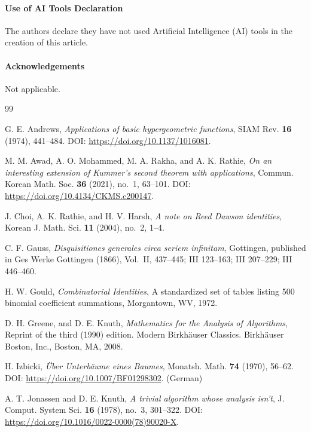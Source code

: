 \documentclass[reqno]{amsart}
\numberwithin{equation}{section}
\theoremstyle{plain}
\theoremstyle{remark}
\begin{document}
\paragraph{\bf Use of AI Tools Declaration}
The authors declare they have not used Artificial Intelligence (AI) tools in the creation of this article.

\paragraph{\bf Acknowledgements}
Not applicable.

\begin{thebibliography}{99}

G. E. Andrews, \textit{Applications of basic hypergeometric functions}, SIAM Rev. \textbf{16} (1974), 441\nobreakdash--484. DOI: \url{https://doi.org/10.1137/1016081}.

M. M. Awad, A. O. Mohammed, M. A. Rakha, and A. K. Rathie, \textit{On an interesting extension of Kummer's second theorem with applications}, Commun. Korean Math. Soc. \textbf{36} (2021), no.~1, 63\nobreakdash--101. DOI: \url{https://doi.org/10.4134/CKMS.c200147}.

J. Choi, A. K. Rathie, and H. V. Harsh, \textit{A note on Reed Dawson identities}, Korean J. Math. Sci. \textbf{11} (2004), no.~2, 1\nobreakdash--4.

C. F. Gauss, \textit{Disquisitiones generales circa seriem infinitam}, Gottingen, published in Ges Werke Gottingen (1866), Vol.~II, 437\nobreakdash--445; III 123\nobreakdash--163; III 207\nobreakdash--229; III 446\nobreakdash--460.

H. W. Gould, \emph{Combinatorial Identities}, A standardized set of tables listing 500 binomial coefficient summations, Morgantown, WV, 1972.

D. H. Greene, and D. E. Knuth, \textit{Mathematics for the Analysis of Algorithms}, Reprint of the third (1990) edition. Modern Birkh\"auser Classics. Birkh\"auser Boston, Inc., Boston, MA, 2008.

H. Izbicki, \textit{\"Uber Unterb\"aume eines Baumes}, Monatsh. Math. \textbf{74} (1970), 56\nobreakdash--62. DOI: \url{https://doi.org/10.1007/BF01298302}. (German)

A. T. Jonassen and D. E. Knuth, \textit{A trivial algorithm whose analysis isn't}, J. Comput. System Sci. \textbf{16} (1978), no.~3, 301\nobreakdash--322. DOI: \url{https://doi.org/10.1016/0022-0000(78)90020-X}.


\end{thebibliography}
\end{document}
